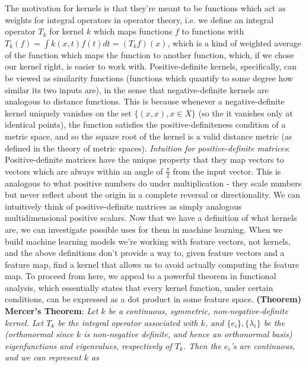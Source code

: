\documentclass{article}
\begin{document}
\newline
\indent The motivation for kernels is that they're meant to be functions which act as weights for integral operators in operator theory, i.e. we define an integral operator $ T_k $ for kernel $ k $ which maps functions $ f $ to functions with $ T_k(f) = \int k(x, t) f(t) dt = (T_k f)(x) $, which is a kind of weighted average of the function which maps the function to another function, which, if we chose our kernel right, is easier to work with. Positive-definite kernels, specifically, can be viewed as similarity functions (functions which quantify to some degree how similar its two inputs are), in the sense that negative-definite kernels are analogous to distance functions. This is because whenever a negative-definite kernel uniquely vanishes on the set $ \{ (x, x), x \in X \} $ (so the it vanishes only at identical points), the function satisfies the positive-definiteness condition of a metric space, and so the square root of the kernel is a valid distance metric (as defined in the theory of metric spaces).
\newline
\indent \textit{Intuition for positive-definite matrices}: Positive-definite matrices have the unique property that they map vectors to vectors which are always within an angle of $ \frac{\pi}{2} $ from the input vector. This is analogous to what positive numbers do under multiplication - they scale numbers but never reflect about the origin in a complete reversal or directionality. We can intuitively think of positive-definite matrices as simply analogous multidimensional positive scalars. 
\newline \newline
Now that we have a definition of what kernels are, we can investigate possible uses for them in machine learning. When we build machine learning models we're working with feature vectors, not kernels, and the above definitions don't provide a way to, given feature vectors and a feature map, find a kernel that allows us to avoid actually computing the feature map. To proceed from here, we appeal to a powerful theorem in functional analysis, which essentially states that every kernel function, under certain conditions, can be expressed as a dot product in some feature space.
\newline \newline
\textbf{(Theorem) Mercer's Theorem}: \textit{Let $ k $ be a continuous, symmetric, non-negative-definite kernel. Let $ T_k $ be the integral operator associated with $ k $, and $ \{ e_i \}, \{ \lambda_i \} $ be the (orthonormal since $ k $ is non-negative definite, and hence an orthonormal basis) eigenfunctions and eigenvalues, respectively of $ T_k $. Then the $ e_i $'s are continuous, and we can represent $ k $ as}
\end{document}
